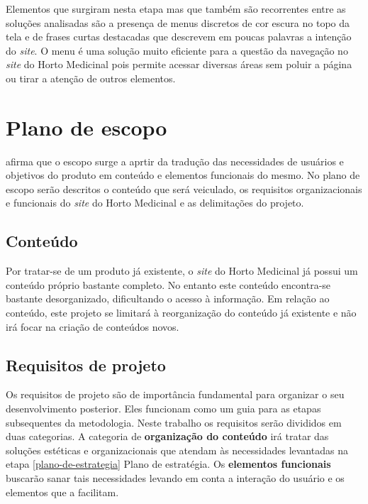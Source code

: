 Elementos que surgiram nesta etapa mas que também são recorrentes entre as soluções analisadas são a presença de menus discretos de cor escura no topo da tela e de frases curtas destacadas que descrevem em poucas palavras a intenção do \emph{site}. O menu é uma solução muito eficiente para a questão da navegação no \emph{site} do Horto Medicinal pois permite acessar diversas áreas sem poluir a página ou tirar a atenção de outros elementos.

\chapter{Plano de escopo}\label{plano-de-escopo}

\textcite{garret02} afirma que o escopo surge a aprtir da tradução das necessidades de usuários e objetivos do produto em conteúdo e elementos funcionais do mesmo. No plano de escopo serão descritos o conteúdo que será veiculado, os requisitos organizacionais e funcionais do \emph{site} do Horto Medicinal e as delimitações do projeto.

\section{Conteúdo}\label{conteudo}

Por tratar-se de um produto já existente, o \emph{site} do Horto Medicinal já possui um conteúdo próprio bastante completo. No entanto este conteúdo encontra-se bastante desorganizado, dificultando o acesso à informação. Em relação ao conteúdo, este projeto se limitará à reorganização do conteúdo já existente e não irá focar na criação de conteúdos novos.

\section{Requisitos de projeto}\label{requisitos-de-projeto}

Os requisitos de projeto são de importância fundamental para organizar o seu desenvolvimento posterior. Eles funcionam como um guia para as etapas subsequentes da metodologia.
Neste trabalho os requisitos serão divididos em duas categorias. A categoria de \textbf{organização do conteúdo} irá tratar das soluções estéticas e organizacionais que atendam às necessidades levantadas na etapa \ref{plano-de-estrategia} Plano de estratégia. Os \textbf{elementos funcionais} buscarão sanar tais necessidades levando em conta a interação do usuário e os elementos que a facilitam.

